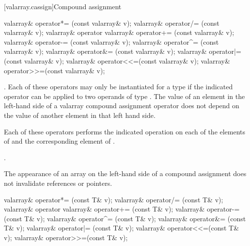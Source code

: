 [valarray.cassign]{Compound assignment}

%
%
%
%
%
%
%
%
%
%
\begin{itemdecl}
valarray& operator*= (const valarray& v);
valarray& operator/= (const valarray& v);
valarray& operator%
valarray& operator+= (const valarray& v);
valarray& operator-= (const valarray& v);
valarray& operator^= (const valarray& v);
valarray& operator&= (const valarray& v);
valarray& operator|= (const valarray& v);
valarray& operator<<=(const valarray& v);
valarray& operator>>=(const valarray& v);
\end{itemdecl}

\begin{itemdescr}
\pnum
\requires
{}.
Each of these operators may only be instantiated for a type 
if the indicated operator can be applied to two operands of type .
The value of an element in the left-hand side of a valarray compound
assignment operator does not depend on the value of another element in that left
hand side.

\pnum
\effects
Each of these operators
performs the indicated operation on each of the elements of  and the
corresponding element of .

\pnum
\returns
{}.

\pnum
\remarks
The appearance of an array on the left-hand side of a compound assignment
does not invalidate references or pointers.
\end{itemdescr}

%
%
%
%
%
%
%
%
%
%
\begin{itemdecl}
valarray& operator*= (const T& v);
valarray& operator/= (const T& v);
valarray& operator%
valarray& operator+= (const T& v);
valarray& operator-= (const T& v);
valarray& operator^= (const T& v);
valarray& operator&= (const T& v);
valarray& operator|= (const T& v);
valarray& operator<<=(const T& v);
valarray& operator>>=(const T& v);
\end{itemdecl}

